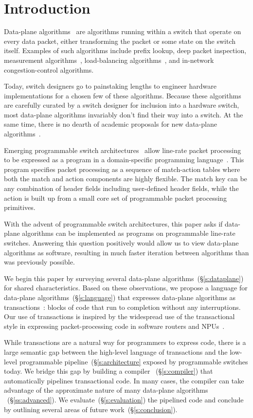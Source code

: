 \section{Introduction}
\label{s:intro}
Data-plane algorithms~\cite{cestan} are algorithms running within a switch that
operate on every data packet, either transforming the packet or some state on
the switch itself. Examples of such algorithms include prefix lookup, deep
packet inspection, measurement algorithms~\cite{minsketch}, load-balancing
algorithms~\cite{conga}, and in-network congestion-control algorithms.

Today, switch designers go to painstaking lengths to engineer hardware
implementations for a chosen few of these algorithms. Because these algorithms
are carefully curated by a switch designer for inclusion into a hardware
switch, most data-plane algorithms invariably don't find their way into a
switch. At the same time, there is no dearth of academic proposals for new
data-plane algorithms~\cite{minsketch, codel, pdq}.

Emerging programmable switch architectures~\cite{flexpipe, xpliant, rmt} allow
line-rate packet processing to be expressed as a program in a domain-specific
programming language~\cite{p4}.  This program specifies packet processing as a
sequence of match-action tables where both the match and action components are
highly flexible. The match key can be any combination of header fields
including user-defined header fields, while the action is built up from a small
core set of programmable packet processing primitives.

With the advent of programmable switch architectures, this paper asks if
data-plane algorithms can be implemented as programs on programmable line-rate
switches. Answering this question positively would allow us to view data-plane
algorithms as software, resulting in much faster iteration between algorithms
than was previously possible.

We begin this paper by surveying several data-plane
algorithms~(\S\ref{s:dataplane}) for shared characteristics. Based on these
observations, we propose a language for data-plane
algorithms~(\S\ref{s:language}) that expresses data-plane algorithms as
transactions~\cite{transactions}: blocks of code that run to completion without
any interruptions. Our use of transactions is inspired by the widespread use of
the transactional style in expressing packet-processing code in software
routers and NPUs~\cite{click, intel, qdisc}.

While transactions are a natural way for programmers to express code, there is
a large semantic gap between the high-level language of transactions and the
low-level programmable pipeline~(\S\ref{s:architecture} exposed by programmable
switches today. We bridge this gap by building a compiler ~(\S\ref{s:compiler})
that automatically pipelines transactional code. In many cases, the compiler
can take advantage of the approximate nature of many data-plane algorithms
~(\S\ref{ss:advanced}). We evaluate~(\S\ref{s:evaluation}) the pipelined code
and conclude by outlining several areas of future work~(\S\ref{s:conclusion}).

